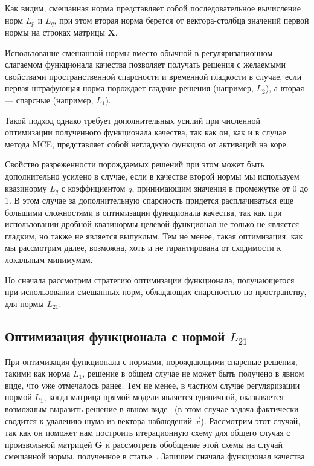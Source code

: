 Как видим, смешанная норма представляет собой последовательное вычисление
норм $L_p$ и $L_q$, при этом вторая норма берется от вектора-столбца значений первой
нормы на строках матрицы $\mathbf{X}$.

Использование смешанной нормы вместо обычной в регуляризационном слагаемом
функционала качества позволяет получать решения с желаемыми свойствами
пространственной спарсности и временной гладкости в случае, если первая штрафующая норма
порождает гладкие решения (например, $L_2$), а вторая --- спарсные (например, $L_1$).

Такой подход однако требует дополнительных усилий при численной оптимизации
полученного функционала качества, так как он, как и в случае метода MCE,
представляет собой негладкую функцию от активаций на коре.

Свойство разреженности порождаемых решений при этом может быть дополнительно
усилено в случае, если в качестве второй нормы мы используем квазинорму $L_q$ с
коэффициентом $q$, принимающим значения в промежутке от 0 до 1. В этом случае
за дополнительную спарсность придется расплачиваться еще большими сложностями в
оптимизации функционала качества, так как при использовании дробной квазинормы
целевой функционал не только не является гладким, но также не является
выпуклым. Тем не менее, такая оптимизация, как мы рассмотрим далее, возможна,
хоть и не гарантирована от сходимости к локальным минимумам.

Но сначала рассмотрим стратегию оптимизации функционала, получающегося при
использовании смешанных норм, обладающих спарсностью по пространству, для нормы
$L_{21}$.

\subsection{Оптимизация функционала с нормой $L_{21}$}

При оптимизация функционала с нормами, порождающими спарсные решения, такими
как норма $L_1$, решение в общем случае не может быть получено в явном виде,
что уже отмечалось ранее.  Тем не менее, в частном случае регуляризации нормой
$L_1$, когда матрица прямой модели является единичной, оказывается возможным
выразить решение в явном виде~\cite{Selesnick2009} (в
этом случае задача фактически сводится к удалению шума из вектора наблюдений
$\vec{x}$). Рассмотрим этот случай, так как он поможет нам построить
итерационную схему для общего случая с произвольной матрицей $\mathbf{G}$ и
рассмотреть обобщение этой схемы на случай смешанной нормы, полученное в
статье~\cite{Gramfort2012}. Запишем сначала функционал качества:

